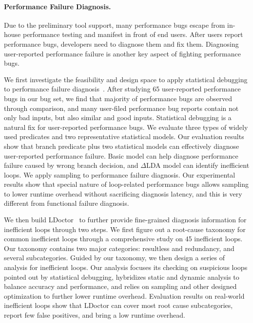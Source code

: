 \documentclass[10pt]{article}
\begin{document}
\vspace{-.1in}
\paragraph{Performance Failure Diagnosis.}
Due to the preliminary tool support, many performance bugs escape from in-house performance testing and manifest in front of end users. 
After users report performance bugs, developers need to diagnose them and fix them.
Diagnosing user-reported performance failure is another key aspect of fighting performance bugs. 

We first investigate the feasibility and design space to apply statistical debugging to performance failure diagnosis~\cite{Song14OOPSLA}.
After studying 65 user-reported performance bugs in our bug set, 
we find that majority of performance bugs are observed through comparison, 
and many user-filed performance bug reports contain not only bad inputs, but also similar and good inputs.
Statistical debugging is a natural fix for user-reported performance bugs. 
We evaluate three types of widely used predicates and two representative statistical models. 
Our evaluation results show that branch predicate plus two statistical models can effectively diagnose user-reported performance failure. 
Basic model can help diagnose performance failure caused by wrong branch decision, and $\Delta$LDA model can identify inefficient loops.  
We apply sampling to performance failure diagnosis. Our experimental results show that
special nature of loop-related performance bugs allows sampling to lower runtime overhead without sacrificing diagnosis latency, 
and this is very different from functional failure diagnosis.

We then build LDoctor~\cite{Song17ICSE} to further provide fine-grained diagnosis information for inefficient loops through two steps. 
We first figure out a root-cause taxonomy for common inefficient loops through a comprehensive study on 45 inefficient loops. 
Our taxonomy contains two major categories: resultless and redundancy, and several subcategories. 
Guided by our taxonomy, we then design a series of analysis for inefficient loops. 
Our analysis 
focuses its checking on suspicious loops pointed out by statistical debugging, 
hybridizes static and dynamic analysis to balance accuracy and performance, 
and relies on sampling and other designed optimization to further lower runtime overhead. 
Evaluation results on real-world inefficient loops show that LDoctor can cover most root cause subcategories, 
report few false positives, and bring a low runtime overhead. 
\end{document}
